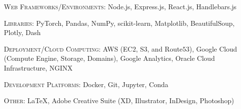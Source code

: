 \documentclass[hidelinks, 10pt]{article}
\begin{document}
{\begin{minipage}[ct]{0.9\linewidth}
    \vspace{1.5mm}

    \textsc{Web Frameworks/Environments: } Node.js, Express.js, React.js, Handlebars.js

    \vspace{1.5mm}

    \textsc{Libraries: } PyTorch, Pandas, NumPy, scikit-learn, Matplotlib,
    BeautifulSoup, Plotly, Dash

    \vspace{1.5mm}

    \textsc{Deployment/Cloud Computing:} AWS (EC$2$, S$3$, and Route$53$),
    Google Cloud (Compute Engine, Storage, Domains), Google Analytics, Oracle Cloud Infrastructure, NGINX

    \vspace{1.5mm}

    \textsc{Development Platforms: } Docker, Git, Jupyter, Conda



    \vspace{1.5mm}

    \textsc{Other: } \LaTeX, Adobe Creative Suite (XD, Illustrator, InDesign, Photoshop)
\end{minipage}

}
\end{document}
